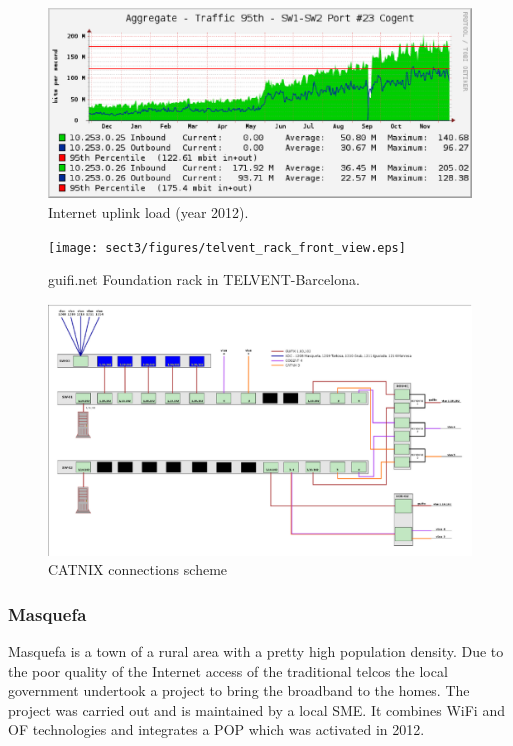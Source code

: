 \begin{figure}[htbp]
  \centering
  \includegraphics[scale=.65]{sect3/figures/cogent_network_load2.eps} 
  \caption{Internet uplink load (year 2012).}
  \label{fig:cogent_load}
\end{figure}


\begin{figure}[htbp]
  \centering
  \texttt{[image: sect3/figures/telvent\_rack\_front\_view.eps]} 
  \caption{guifi.net Foundation rack in TELVENT-Barcelona.}
  \label{fig:telvent_rack}
\end{figure}


\begin{figure}[htbp]
  \centering
  \includegraphics[scale=.75]{sect3/figures/telvent_scheme.eps} 
  \caption{CATNIX connections scheme}
  \label{fig:telvent_scheme}
\end{figure}



\FloatBarrier
\subsubsection{Masquefa}

Masquefa is a town of a rural area with a pretty high population density. Due to the poor quality of the Internet access of the traditional telcos the local government undertook a project to bring the broadband to the homes. The project was carried out and is maintained by a local SME. It combines WiFi and OF technologies and integrates a POP which was activated in 2012.


